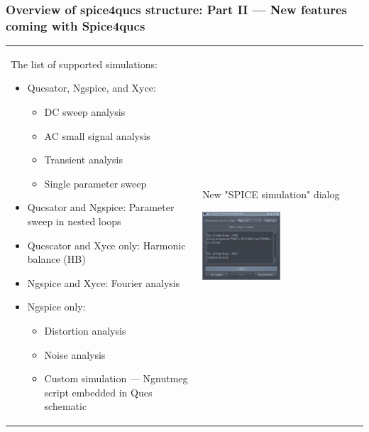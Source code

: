 \documentclass[9pt]{beamer}
\begin{document}
\begin{frame}
 \frametitle{Overview of spice4qucs structure: Part II --- New features coming 
with Spice4qucs}
  \begin{tabular}{p{}p{}}
  
  The list of supported simulations:
    \begin{itemize}
     \item Qucsator, Ngspice, and Xyce:
     \begin{itemize}
      \item DC sweep analysis
      \item AC small signal analysis
      \item Transient analysis
      \item Single parameter sweep
     \end{itemize}
     \item Qucsator and Ngspice: Parameter sweep in nested loops
     \item Qucscator and Xyce only: Harmonic balance (HB)
     \item Ngspice and Xyce: Fourier analysis
     \item Ngspice only:
     \begin{itemize}
      \item Distortion analysis
      \item Noise analysis
      \item Custom simulation --- Ngnutmeg script embedded in Qucs schematic
     \end{itemize}

    \end{itemize}
    & New "SPICE simulation" dialog
    
\includegraphics[width=0.5\textwidth]{img/s4q_dlg.png} \\
  \end{tabular}

\end{frame}
\end{document}
